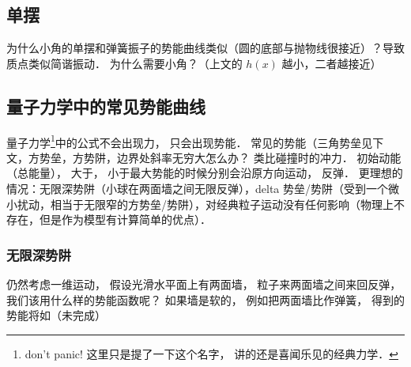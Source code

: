 \subsection{单摆}
为什么小角的单摆和弹簧振子的势能曲线类似（圆的底部与抛物线很接近）？导致质点类似简谐振动． 为什么需要小角？（上文的 $h(x)$ 越小，二者越接近）

\subsection{量子力学中的常见势能曲线}

量子力学\footnote{don't panic! 这里只是提了一下这个名字， 讲的还是喜闻乐见的经典力学．}中的公式不会出现力， 只会出现势能． 常见的势能（三角势垒见下文，方势垒，方势阱，边界处斜率无穷大怎么办？ 类比碰撞时的冲力． 初始动能（总能量）， 大于， 小于最大势能的时候分别会沿原方向运动， 反弹． 更理想的情况：无限深势阱（小球在两面墙之间无限反弹），delta 势垒/势阱（受到一个微小扰动，相当于无限窄的方势垒/势阱），对经典粒子运动没有任何影响（物理上不存在，但是作为模型有计算简单的优点）．

\subsubsection{无限深势阱}
仍然考虑一维运动， 假设光滑水平面上有两面墙， 粒子来两面墙之间来回反弹， 我们该用什么样的势能函数呢？ 如果墙是软的， 例如把两面墙比作弹簧， 得到的势能将如（未完成）